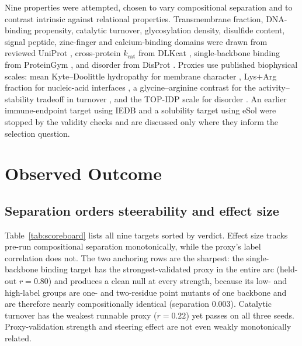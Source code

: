 \documentclass{article}
\begin{document}
Nine properties were attempted, chosen to vary compositional separation and to
contrast intrinsic against relational properties. Transmembrane fraction,
DNA-binding propensity, catalytic turnover, glycosylation density, disulfide
content, signal peptide, zinc-finger and calcium-binding domains were drawn
from reviewed UniProt \citep{uniprot2023}, cross-protein $k_{\mathrm{cat}}$ from
DLKcat \citep{li2022dlkcat}, single-backbone binding from ProteinGym
\citep{notin2023proteingym}, and disorder from DisProt
\citep{quaglia2022disprot}. Proxies use published biophysical scales: mean
Kyte--Doolittle hydropathy for membrane character \citep{kyte1982hydropathy},
Lys$+$Arg fraction for nucleic-acid interfaces \citep{luscombe2001dna}, a
glycine--arginine contrast for the activity--stability tradeoff in turnover
\citep{siddiqui2006cold}, and the TOP-IDP scale for disorder
\citep{campen2008topidp}. An earlier immune-endpoint target using IEDB
\citep{vita2019iedb} and a solubility target using eSol \citep{niwa2009esol}
were stopped by the validity checks and are discussed only where they inform
the selection question.

\section{Observed Outcome}
\label{sec:outcome}

\subsection{Separation orders steerability and effect size}

Table~\ref{tab:scoreboard} lists all nine targets sorted by verdict. Effect
size tracks pre-run compositional separation monotonically, while the proxy's
label correlation does not. The two anchoring rows are the sharpest: the
single-backbone binding target has the strongest-validated proxy in the entire
arc (held-out $r=0.80$) and produces a clean null at every strength, because its
low- and high-label groups are one- and two-residue point mutants of one
backbone and are therefore nearly compositionally identical (separation
$0.003$). Catalytic turnover has the weakest runnable proxy ($r=0.22$) yet
passes on all three seeds. Proxy-validation strength and steering effect are not
even weakly monotonically related.
\end{document}
